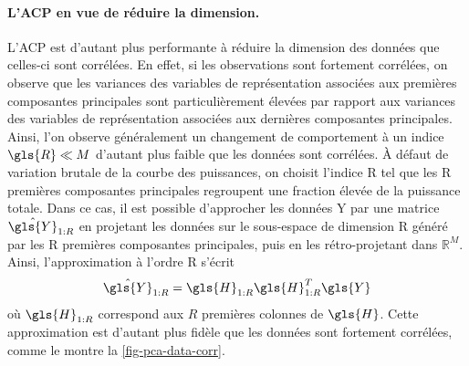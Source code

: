     \paragraph{L'ACP en vue de réduire la dimension.} L'ACP est d'autant plus performante à réduire la dimension des données que celles-ci sont corrélées. En effet, si les observations sont fortement corrélées, on observe que les variances des variables de représentation associées aux premières composantes principales sont particulièrement élevées par rapport aux variances des variables de représentation associées aux dernières composantes principales.
    Ainsi, l'on observe généralement un changement de comportement à un indice $\gls{R}\ll M$ d'autant plus faible que les données sont corrélées. \`A défaut de variation brutale de la courbe des puissances, on choisit l'indice \gls{R} tel que les \gls{R} premières composantes principales regroupent une fraction élevée de la puissance totale.
    Dans ce cas, il est possible d'approcher les données \gls{Y} par une matrice $\hat{\gls{Y}}_{1:R}$ en projetant les données sur le sous-espace de dimension \gls{R} généré par les \gls{R} premières composantes principales, puis en les rétro-projetant dans $\mathbb{R}^M$. Ainsi, l'approximation à l'ordre \gls{R} s'écrit
    \begin{equation}
    \hat{\gls{Y}}_{1:R} = \gls{H}_{1:R}\gls{H}_{1:R}^T\gls{Y}
    \end{equation}
    où $\gls{H}_{1:R}$ correspond aux $R$ premières colonnes de $\gls{H}$. Cette approximation est d'autant plus fidèle que les données sont fortement corrélées, comme le montre la \cref{fig-pca-data-corr}.

